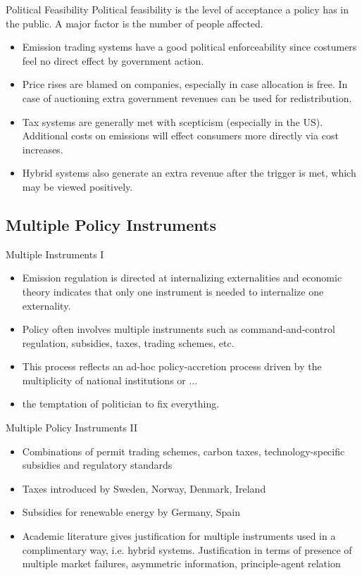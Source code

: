 {Political Feasibility}
Political feasibility is the level of acceptance a policy has in the public. A major factor is the number of people affected.
\begin{itemize}
\item<1-> Emission trading systems have a good political enforceability since costumers feel no direct effect by government action.
\item<2-> Price rises are blamed on companies, especially in case allocation is free. In case of auctioning extra government revenues can be used for redistribution.
\item<3-> Tax systems are generally met with scepticism (especially in the US). Additional costs on emissions will effect consumers more directly via cost increases.
\item<4-> Hybrid systems also generate an extra revenue after the trigger is met, which may be viewed positively.
\end{itemize}




\subsection{Multiple Policy Instruments}



{Multiple Instruments I}
\begin{itemize}
\item<1-> Emission regulation is directed at internalizing externalities and economic theory indicates that only one instrument is needed to
internalize one externality.
\item<2-> Policy often involves multiple instruments such as command-and-control regulation, subsidies, taxes, trading schemes, etc.
\item<3-> This process reflects an ad-hoc policy-accretion process driven by the multiplicity of national institutions or ...
\item<4-> the temptation of politician to fix everything.
\end{itemize}





{Multiple Policy Instruments II}
\begin{itemize}
\item<1-> Combinations of permit trading schemes, carbon taxes, technology-specific subsidies and regulatory standards
\item<2-> Taxes introduced by Sweden, Norway, Denmark, Ireland
\item<3-> Subsidies for renewable energy by Germany, Spain
\item<4-> Academic literature gives justification for multiple instruments used in a complimentary way, i.e. hybrid systems. Justification in terms of presence of multiple market failures, asymmetric information, principle-agent relation
 \end{itemize}



